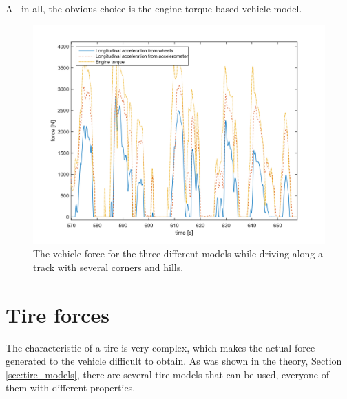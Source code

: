 All in all, the obvious choice is the engine torque based vehicle model.

\begin{figure}[h]
	\centering
	\includegraphics[width=1\textwidth]{Pictures/vehicle_model_comp_mm2}
	\caption{The vehicle force for the three different models while driving along a track with several corners and hills.}
	\label{vehicle_model_comp_mm2}
\end{figure}

\section{Tire forces}
\label{tire_forces}
The characteristic of a tire is very complex, which makes the actual force generated to the vehicle difficult to obtain. As was shown in the theory, Section \ref{sec:tire_models}, there are several tire models that can be used, everyone of them with different properties.

